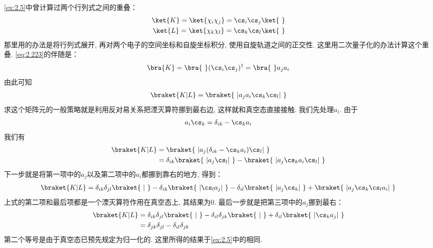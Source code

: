 \autoref{ex:2.5}中曾计算过两个行列式之间的重叠：
\begin{align}\label{eq:2.223}
\ket{K} = \ket{\chi_i\chi_j} = \cs_i\cs_j\ket{\,\,}\\
\ket{L} = \ket{\chi_k\chi_l} = \cs_k\cs_l\ket{\,\,}
\label{eq:2.224}
\end{align}
那里用的办法是将行列式展开, 
再对两个电子的空间坐标和自旋坐标积分, 
使用自旋轨道之间的正交性. 
这里用二次量子化的办法计算这个重叠. 
\autoref{eq:2.223}的伴随是：
\begin{align}
\bra{K} = \bra{\,\,}(\cs_i\cs_j)^\dagger = \bra{\,\,}a_ja_i
\end{align}
由此可知
\begin{align}
\braket{K|L} = \braket{\,\,|a_ja_i\cs_k\cs_l|\,\,}
\end{align}
求这个矩阵元的一般策略就是利用反对易关系把湮灭算符挪到最右边, 
这样就和真空态直接接触. 
我们先处理$a_i$. 
由于
\begin{align}
a_i\cs_k = \delta_{ik} - \cs_ka_i
\end{align}
我们有
\begin{align}\nonumber
\braket{K|L} & = \braket{\,\,|a_j(\delta_{ik}-\cs_ka_i)\cs_l|\,\,}\\
             & = \delta_{ik}\braket{\,\,|a_j\cs_l|\,\,} - \braket{\,\,|a_j\cs_ka_i\cs_l|\,\,}
\end{align}
下一步就是将第一项中的$a_j$以及第二项中的$a_i$都挪到靠右的地方, 
得到：
\begin{align}
\braket{K|L} = \delta_{ik}\delta_{jl} \braket{\,\,|\,\,} - \delta_{ik}\braket{\,\,|\cs_la_j|\,\,} - \delta_{il}\braket{\,\,|a_j\cs_k|\,\,} + \braket{\,\,|a_j\cs_k\cs_la_i|\,\,}
\end{align}
上式的第二项和最后项都是一个湮灭算符作用在真空态上, 
其结果为$0$. 
最后一步就是把第三项中的$a_j$挪到最右：
\begin{align}
\braket{K|L} & = \delta_{ik}\delta_{jl} \braket{\,\,|\,\,} - \delta_{il}\delta_{jk}\braket{\,\,|\,\,} + \delta_{il}\braket{\,\,|\cs_ka_j|\,\,}\notag\\
& = \delta_{jk}\delta_{jl} - \delta_{il}\delta_{jk}
\end{align}
第二个等号是由于真空态已预先规定为归一化的. 
这里所得的结果于\autoref{ex:2.5}中的相同. 

